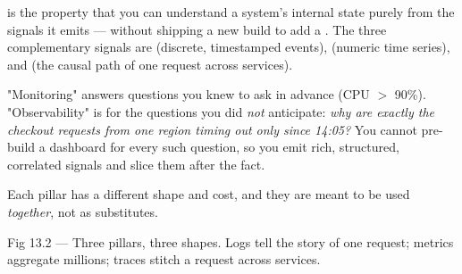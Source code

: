 

  is the property that you can understand a system's internal state purely from the signals it emits --- without shipping a new build to add a . The three complementary signals are  (discrete, timestamped events),  (numeric time series), and  (the causal path of one request across services).

 "Monitoring" answers questions you knew to ask in advance (CPU $>$ 90\%). "Observability" is for the questions you did \emph{not} anticipate: \emph{why are exactly the checkout requests from one region timing out only since 14:05?} You cannot pre-build a dashboard for every such question, so you emit rich, structured, correlated signals and slice them after the fact.

 Each pillar has a different shape and cost, and they are meant to be used \emph{together}, not as substitutes.

\begin{wbfigure}{Fig 13.2 --- Three pillars, three shapes. Logs tell the story of one request; metrics aggregate millions; traces stitch a request across services.}
\end{wbfigure}

